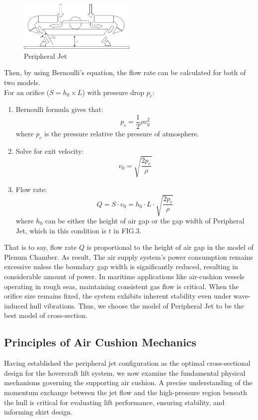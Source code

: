 \begin{figure}[H]
  \centering
  \includegraphics[width=0.5\textwidth]{images/PeripheralJet.jpg}
  \caption{Peripheral Jet}
  \label{fig:PeripheralJet}
\end{figure}


Then, by using Bernoulli’s equation, the flow rate can be calculated for both of two models.\\
For an orifice ($S\!=\!h_0\!\times\!L$) with pressure drop $\!p_c\!$:
\begin{enumerate}
\item Bernoulli formula gives that:
\begin{equation}
p_c = \frac{1}{2}\rho v_0^2
\end{equation}
where $p_c$ is the pressure relative the pressure of atmosphere.
\item Solve for exit velocity:
\begin{equation}
v_0 = \sqrt{\frac{2p_c}{\rho}}
\end{equation}

\item Flow rate:
\begin{equation}
Q = S \cdot v_0 = h_0 \cdot L \cdot \sqrt{\frac{2p_c}{\rho}}
\end{equation}
where $h_0$ can be either the height of air gap or the gap width of Peripheral Jet, which in this condition is $t$ in FIG.3.
\end{enumerate}

That is to say, flow rate $Q$ is proportional to the height of air gap in the model of Plenum Chamber. As result, The air supply system's power consumption remains excessive unless the boundary gap width is significantly reduced, resulting in considerable amount of power. In maritime applications like air-cushion vessels operating in rough seas, maintaining consistent gas flow is critical. When the orifice size remains fixed, the system exhibits inherent stability even under wave-induced hull vibrations. Thus, we choose the model of Peripheral Jet to be the best model of cross-section.

\subsection{Principles of Air Cushion Mechanics}
\label{sec:ACM}
Having established the peripheral jet configuration as the optimal cross-sectional design for the hovercraft lift system, we now examine the fundamental physical mechanisms governing the supporting air cushion. A precise understanding of the momentum exchange between the jet flow and the high-pressure region beneath the hull is critical for evaluating lift performance, ensuring stability, and informing skirt design.

